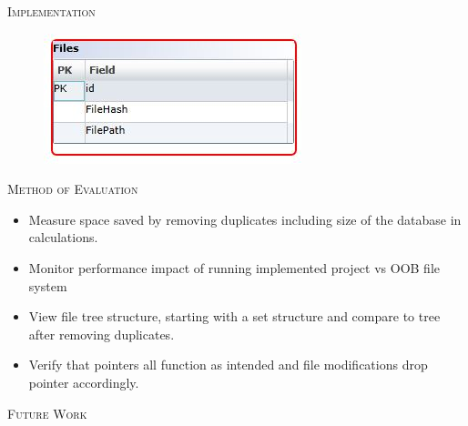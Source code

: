 \documentclass[final,t]{beamer}
\begin{document}
\begin{frame}{}
\begin{columns}[t]
\begin{column}{.325\linewidth}
\begin{block}{\textsc{Implementation}}
          \vspace*{.2in}    
              
          \begin{figure}			
  	    \centering
            \includegraphics[scale=2.2]{schema.JPG}
            \vspace*{.05in}
            
	  \end{figure}
	\end{block}
	
        \begin{block}{\textsc{Method of Evaluation}}
          \begin{itemize}

            \item Measure space saved by removing duplicates including size of the database in calculations.

            \item Monitor performance impact of running implemented project vs OOB file system

            \item View file tree structure, starting with a set structure and compare to tree after removing duplicates.
            
            \item Verify that pointers all function as intended and file modifications drop pointer accordingly.

          \end{itemize}

          \vspace*{.2in}    
          
	\end{block}
	
	\begin{alertblock}{\textsc{Future Work}}
		
		
	\end{alertblock}
      \end{column}
      
	\end{columns}
  \end{frame}
\end{document}
